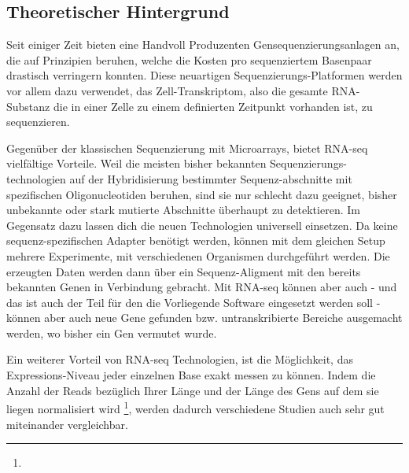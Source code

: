 \documentclass[a4paper]{thesis}
\begin{document}
\subsection{Theoretischer Hintergrund}

Seit einiger Zeit bieten eine Handvoll Produzenten Gensequenzierungsanlagen an,
die auf Prinzipien beruhen, welche die Kosten pro sequenziertem Basenpaar
drastisch verringern konnten. Diese neuartigen
Sequenzierungs-Platformen werden vor allem 
dazu verwendet, das Zell-Transkriptom, also die gesamte RNA-Substanz die
in einer Zelle zu einem definierten Zeitpunkt vorhanden ist, zu sequenzieren.

Gegenüber der klassischen Sequenzierung mit Microarrays, bietet RNA-seq
vielfältige Vorteile. Weil die meisten bisher bekannten Sequenzierungs-
technologien auf der Hybridisierung bestimmter Sequenz-abschnitte mit
spezifischen Oligonucleotiden beruhen, sind sie nur schlecht dazu geeignet,
bisher unbekannte oder stark mutierte Abschnitte überhaupt zu detektieren.
Im Gegensatz dazu lassen dich die neuen Technologien universell einsetzen. Da
keine sequenz-spezifischen Adapter benötigt werden, können mit dem gleichen
Setup mehrere Experimente, mit verschiedenen Organismen durchgeführt werden.
Die erzeugten Daten werden dann über ein Sequenz-Aligment mit den bereits
bekannten Genen in Verbindung gebracht. Mit RNA-seq können aber auch - und
das ist auch der Teil für den die Vorliegende Software eingesetzt werden
soll - können aber auch neue Gene gefunden bzw. untranskribierte Bereiche
ausgemacht werden, wo bisher ein Gen vermutet wurde.
\cite{croucher_studying_2010}

\def\fnI{
	Third, whereas hybridization-based methods measure gene expression
	levels through detection of fluorescence or radioactivity, RNA-seq
	uses the amount of data matching a given coding sequence (CDS),
	typically quantified as reads per kilobase CDS length per million
	reads analyzed (RPKM) [4].
	\cite{croucher_studying_2010}
}

Ein weiterer Vorteil von RNA-seq Technologien, ist die Möglichkeit,
das Expressions-Niveau jeder einzelnen Base exakt messen zu können.
Indem die Anzahl der Reads bezüglich Ihrer Länge und der Länge des
Gens auf dem sie liegen normalisiert wird \footnote{\expandafter\fnI}, werden
dadurch verschiedene Studien auch sehr gut miteinander vergleichbar.
\cite{croucher_studying_2010,wang_rna-seq:_2009}
\end{document}
